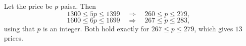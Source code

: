 Let the price be $p$ paisa. Then
\[1300\le5p\le1399\quad\Longrightarrow\quad260\le p\le279,\]
\[1600\le6p\le1699\quad\Longrightarrow\quad267\le p\le283,\]
using that $p$ is an integer. Both hold exactly for $267\le p\le279$, which gives $\boxed{13}$ prices.
